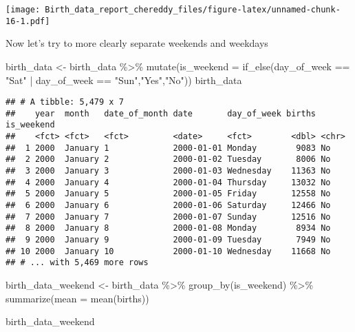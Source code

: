 \documentclass[
]{article}
\newenvironment{Shaded}{\begin{snugshade}}{\end{snugshade}}
\newcommand{\AttributeTok}[1]{\textcolor[rgb]{0.77,0.63,0.00}{#1}}
\newcommand{\FunctionTok}[1]{\textcolor[rgb]{0.00,0.00,0.00}{#1}}
\newcommand{\NormalTok}[1]{#1}
\newcommand{\OtherTok}[1]{\textcolor[rgb]{0.56,0.35,0.01}{#1}}
\newcommand{\SpecialCharTok}[1]{\textcolor[rgb]{0.00,0.00,0.00}{#1}}
\newcommand{\StringTok}[1]{\textcolor[rgb]{0.31,0.60,0.02}{#1}}
\begin{document}
\texttt{[image: Birth\_data\_report\_chereddy\_files/figure-latex/unnamed-chunk-16-1.pdf]}

Now let's try to more clearly separate weekends and weekdays

\begin{Shaded}
\begin{Highlighting}[]
\NormalTok{birth\_data }\OtherTok{\textless{}{-}}\NormalTok{ birth\_data }\SpecialCharTok{\%\textgreater{}\%}
  \FunctionTok{mutate}\NormalTok{(}\AttributeTok{is\_weekend =} \FunctionTok{if\_else}\NormalTok{(day\_of\_week }\SpecialCharTok{==} \StringTok{"Sat"} \SpecialCharTok{|}\NormalTok{ day\_of\_week }\SpecialCharTok{==} \StringTok{"Sun"}\NormalTok{,}\StringTok{"Yes"}\NormalTok{,}\StringTok{"No"}\NormalTok{))}
\NormalTok{birth\_data}
\end{Highlighting}
\end{Shaded}

\begin{verbatim}
## # A tibble: 5,479 x 7
##    year  month   date_of_month date       day_of_week births is_weekend
##    <fct> <fct>   <fct>         <date>     <fct>        <dbl> <chr>     
##  1 2000  January 1             2000-01-01 Monday        9083 No        
##  2 2000  January 2             2000-01-02 Tuesday       8006 No        
##  3 2000  January 3             2000-01-03 Wednesday    11363 No        
##  4 2000  January 4             2000-01-04 Thursday     13032 No        
##  5 2000  January 5             2000-01-05 Friday       12558 No        
##  6 2000  January 6             2000-01-06 Saturday     12466 No        
##  7 2000  January 7             2000-01-07 Sunday       12516 No        
##  8 2000  January 8             2000-01-08 Monday        8934 No        
##  9 2000  January 9             2000-01-09 Tuesday       7949 No        
## 10 2000  January 10            2000-01-10 Wednesday    11668 No        
## # ... with 5,469 more rows
\end{verbatim}

\begin{Shaded}
\begin{Highlighting}[]
\NormalTok{birth\_data\_weekend }\OtherTok{\textless{}{-}}\NormalTok{ birth\_data }\SpecialCharTok{\%\textgreater{}\%} 
  \FunctionTok{group\_by}\NormalTok{(is\_weekend) }\SpecialCharTok{\%\textgreater{}\%} 
  \FunctionTok{summarize}\NormalTok{(}\AttributeTok{mean =} \FunctionTok{mean}\NormalTok{(births))}

\NormalTok{birth\_data\_weekend}
\end{Highlighting}
\end{Shaded}
\end{document}
